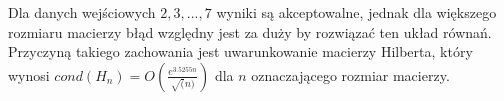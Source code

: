 Dla danych wejściowych $2,3,...,7$ wyniki są akceptowalne, jednak dla większego rozmiaru macierzy
błąd względny jest za duży by rozwiązać ten układ równań. Przyczyną takiego zachowania jest uwarunkowanie macierzy
Hilberta, który wynosi 
$cond(H_n) = O\left({\frac{e^{3.5255n}}{\sqrt(n)}}\right)$ dla $n$ oznaczającego rozmiar macierzy.


